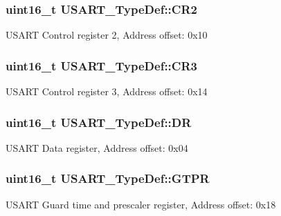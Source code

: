 \subsubsection[{\texorpdfstring{C\+R2}{CR2}}]{ uint16\+\_\+t U\+S\+A\+R\+T\+\_\+\+Type\+Def\+::\+C\+R2}\hypertarget{struct_u_s_a_r_t___type_def_a2a494156d185762e4596696796c393bc}{}\label{struct_u_s_a_r_t___type_def_a2a494156d185762e4596696796c393bc}
U\+S\+A\+RT Control register 2, Address offset\+: 0x10 
\subsubsection[{\texorpdfstring{C\+R3}{CR3}}]{ uint16\+\_\+t U\+S\+A\+R\+T\+\_\+\+Type\+Def\+::\+C\+R3}\hypertarget{struct_u_s_a_r_t___type_def_a2b9d1df38cb1d745305c8190a8707a0f}{}\label{struct_u_s_a_r_t___type_def_a2b9d1df38cb1d745305c8190a8707a0f}
U\+S\+A\+RT Control register 3, Address offset\+: 0x14 
\subsubsection[{\texorpdfstring{DR}{DR}}]{ uint16\+\_\+t U\+S\+A\+R\+T\+\_\+\+Type\+Def\+::\+DR}\hypertarget{struct_u_s_a_r_t___type_def_accee34aaec89aad4aeef512bba173ae5}{}\label{struct_u_s_a_r_t___type_def_accee34aaec89aad4aeef512bba173ae5}
U\+S\+A\+RT Data register, Address offset\+: 0x04 
\subsubsection[{\texorpdfstring{G\+T\+PR}{GTPR}}]{ uint16\+\_\+t U\+S\+A\+R\+T\+\_\+\+Type\+Def\+::\+G\+T\+PR}\hypertarget{struct_u_s_a_r_t___type_def_abe51502097b1fd281d0a2a1b157d769e}{}\label{struct_u_s_a_r_t___type_def_abe51502097b1fd281d0a2a1b157d769e}
U\+S\+A\+RT Guard time and prescaler register, Address offset\+: 0x18 
